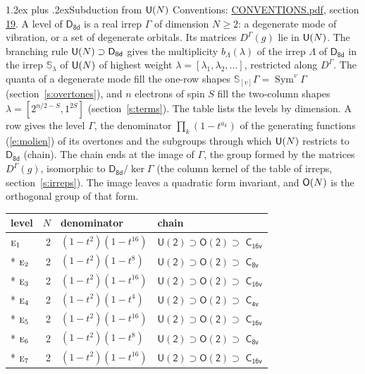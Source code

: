 \documentclass[10pt,a4paper]{article}
\makeatletter
\renewcommand\section{\@startsection{section}{1}{\z@}{-3ex plus -1ex minus -.2ex}%
  {1.2ex plus .2ex}{\normalfont\large\sffamily\bfseries\color{parttitle}}}
\numberwithin{equation}{section}
\newcommand{\grp}[1]{\mathsf{#1}}
\newcommand{\irr}[1]{\text{\normalfont\scshape #1}}
\newcommand{\repD}[1]{D^{#1}}
\newcommand{\schur}[1]{\mathbb{S}_{#1}}
\newcommand{\shape}[1]{[#1]}
\makeatother
\begin{document}
\section{Subduction from \texorpdfstring{$\grp{U(\mathnormal{N})}$}{U(N)}}\label{s:unitary}
Conventions: \href{../../CONVENTIONS.pdf}{CONVENTIONS.pdf}, section \href{../../CONVENTIONS.pdf\#conv.19}{19}.
\leavevmode\label{n:local.level.dimension}A level of $\grp{D_{8d}}$ is a real irrep $\Gamma$ of dimension $N \ge 2$: a degenerate mode of vibration, or a set of degenerate orbitals. \label{n:group.unitary}Its matrices $\repD{\Gamma}(g)$ lie in $\grp{U(\mathnormal{N})}$. \label{n:irrep.schur}\label{n:shape.partition}\label{n:local.partition}\label{n:function.multiplicity.unitary}The branching rule $\grp{U(\mathnormal{N})} \supset \grp{D_{8d}}$ gives the multiplicity $b_\Lambda(\lambda)$ of the irrep $\Lambda$ of $\grp{D_{8d}}$ in the irrep $\schur{\lambda}$ of $\grp{U(\mathnormal{N})}$ of highest weight $\lambda = \shape{\lambda_1, \lambda_2, \dots}$, restricted along $\repD{\Gamma}$. \label{n:local.partition.power}\label{n:local.electrons}\label{n:local.spin}The quanta of a degenerate mode fill the one-row shapes $\schur{\shape{v}}\Gamma = \operatorname{Sym}^{v}\Gamma$ (section~\ref{s:overtones}), and $n$ electrons of spin $S$ fill the two-column shapes $\lambda = \shape{2^{n/2-S}, 1^{2S}}$ (section~\ref{s:terms}).
The table lists the levels by dimension. \label{n:head.level}\label{n:head.denominator}\label{n:index.overtone.denominator}\label{n:head.chain}A row gives the level $\Gamma$, the denominator $\prod_k (1 - t^{a_k})$ of the generating functions (\ref{e:molien}) of its overtones and the subgroups through which $\grp{U(\mathnormal{N})}$ restricts to $\grp{D_{8d}}$ (chain). The chain ends at the image of $\Gamma$, the group formed by the matrices $\repD{\Gamma}(g)$, isomorphic to $\grp{D_{8d}}/\ker\Gamma$ (the column kernel of the table of irreps, section~\ref{s:irreps}). The image leaves a quadratic form invariant, and $\grp{O(\mathnormal{N})}$ is the orthogonal group of that form.
{\small\begin{longtable}{@{}lrll@{}}\toprule
level & $N$ & denominator & chain\\\midrule\endhead
\bottomrule\endfoot\endlastfoot
$\irr{e}_{1}$ & 2 & $(1-t^{2})(1-t^{16})$ & $\grp{U(2)} \supset \grp{O(2)} \supset$ $\grp{C_{16v}}$\\*
$\irr{e}_{2}$ & 2 & $(1-t^{2})(1-t^{8})$ & $\grp{U(2)} \supset \grp{O(2)} \supset$ \href{C8v.pdf}{$\grp{C_{8v}}$}\\*
$\irr{e}_{3}$ & 2 & $(1-t^{2})(1-t^{16})$ & $\grp{U(2)} \supset \grp{O(2)} \supset$ $\grp{C_{16v}}$\\*
$\irr{e}_{4}$ & 2 & $(1-t^{2})(1-t^{4})$ & $\grp{U(2)} \supset \grp{O(2)} \supset$ \href{C4v.pdf}{$\grp{C_{4v}}$}\\*
$\irr{e}_{5}$ & 2 & $(1-t^{2})(1-t^{16})$ & $\grp{U(2)} \supset \grp{O(2)} \supset$ $\grp{C_{16v}}$\\*
$\irr{e}_{6}$ & 2 & $(1-t^{2})(1-t^{8})$ & $\grp{U(2)} \supset \grp{O(2)} \supset$ \href{C8v.pdf}{$\grp{C_{8v}}$}\\*
$\irr{e}_{7}$ & 2 & $(1-t^{2})(1-t^{16})$ & $\grp{U(2)} \supset \grp{O(2)} \supset$ $\grp{C_{16v}}$\\
\bottomrule\end{longtable}}
\end{document}
